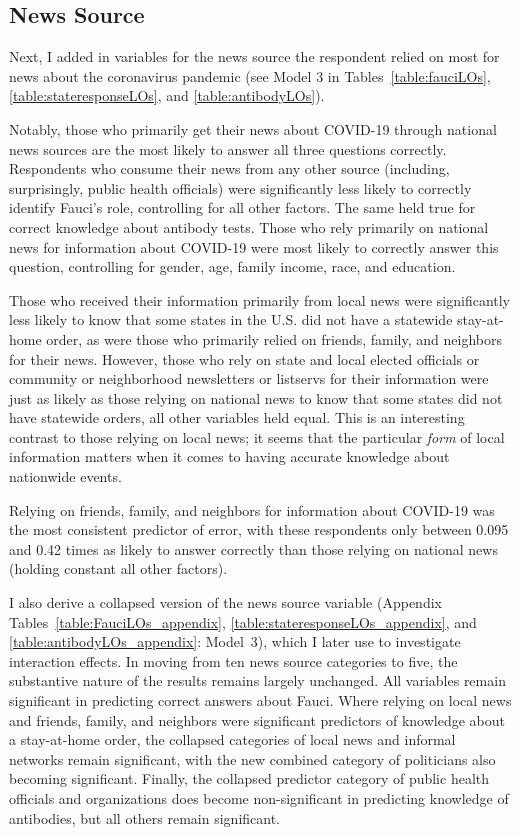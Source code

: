 \documentclass[11pt]{article}
\begin{document}
\subsection{News Source}\label{sec:news source}

Next, I added in variables for the news source the respondent relied on most for news about the coronavirus pandemic (see Model 3 in Tables~\ref{table:fauciLOs}, \ref{table:stateresponseLOs}, and \ref{table:antibodyLOs}).

Notably, those who primarily get their news about COVID-19 through national news sources are the most likely to answer all three questions correctly. Respondents who consume their news from any other source (including, surprisingly, public health officials) were significantly less likely to correctly identify Fauci's role, controlling for all other factors. The same held true for correct knowledge about antibody tests. Those who rely primarily on national news for information about COVID-19 were most likely to correctly answer this question, controlling for gender, age, family income, race, and education.

Those who received their information primarily from local news were significantly less likely to know that some states in the U.S. did not have a statewide stay-at-home order, as were those who primarily relied on friends, family, and neighbors for their news. However, those who rely on state and local elected officials or community or neighborhood newsletters or listservs for their information were just as likely as those relying on national news to know that some states did not have statewide orders, all other variables held equal. This is an interesting contrast to those relying on local news; it seems that the particular \emph{form} of local information matters when it comes to having accurate knowledge about nationwide events.

Relying on friends, family, and neighbors for information about COVID-19 was the most consistent predictor of error, with these respondents only between 0.095 and 0.42 times as likely to answer correctly than those relying on national news (holding constant all other factors).

I also derive a collapsed version of the news source variable (Appendix Tables~\ref{table:FauciLOs_appendix}, \ref{table:stateresponseLOs_appendix}, and \ref{table:antibodyLOs_appendix}: Model~3), which I later use to investigate interaction effects. In moving from ten news source categories to five, the substantive nature of the results remains largely unchanged. All variables remain significant in predicting correct answers about Fauci. Where relying on local news and friends, family, and neighbors were significant predictors of knowledge about a stay-at-home order, the collapsed categories of local news and informal networks remain significant, with the new combined category of politicians also becoming significant. Finally, the collapsed predictor category of public health officials and organizations does become non-significant in predicting knowledge of antibodies, but all others remain significant.
\end{document}
